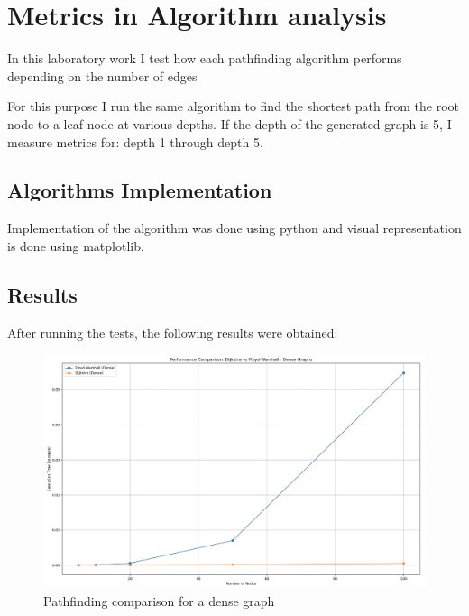 \documentclass[12pt]{article}
\begin{document}
\clearpage
\section*{Metrics in Algorithm analysis}

In this laboratory work I test how each pathfinding algorithm performs 
depending on the number of edges

For this purpose I run the same algorithm
to find the shortest path from the root node to a leaf node at various depths.
If the depth of the generated graph is 5, I measure metrics for: depth 1 through depth 5.


\subsection*{Algorithms Implementation}


Implementation of the algorithm was done using python and visual representation 
is done using matplotlib.

\subsection*{Results}
After running the tests, the following results were obtained:

\begin{figure}[h]
    \centering
    \includegraphics[width=1\textwidth]{images/dense.png}
    \caption{Pathfinding comparison for a dense graph}
    \label{fig:w20d4}
\end{figure}
\end{document}
